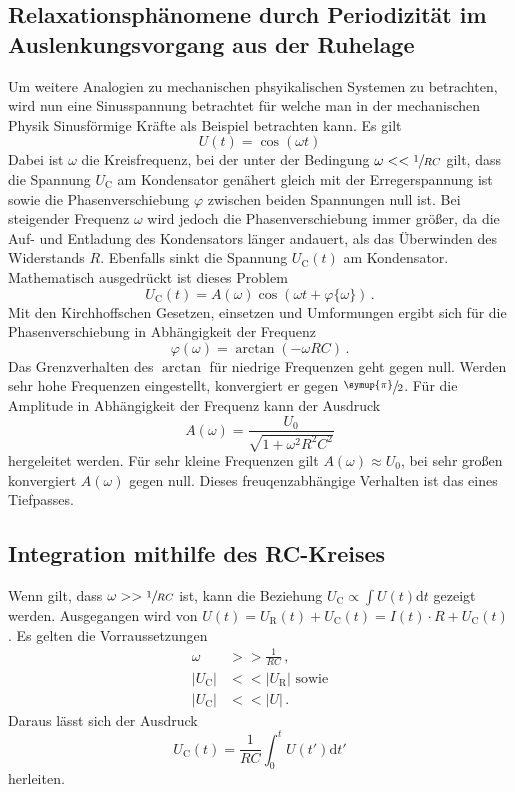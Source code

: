 \subsection{Relaxationsphänomene durch Periodizität im Auslenkungsvorgang
aus der Ruhelage}
Um weitere Analogien zu mechanischen phsyikalischen Systemen zu betrachten,
wird nun eine Sinusspannung betrachtet für welche man in der mechanischen 
Physik Sinusförmige Kräfte als Beispiel betrachten kann. Es gilt
\begin{equation}
    U(t)=\cos(\omega t)
\end{equation}
Dabei ist $\omega$ die Kreisfrequenz, bei der unter der Bedingung $\omega<<\sfrac{1}{RC}$
gilt, dass die Spannung $U_\text{C}$ am Kondensator genähert gleich mit der Erregerspannung ist
sowie die Phasenverschiebung $\varphi$ zwischen beiden Spannungen null ist.
Bei steigender Frequenz $\omega$ wird jedoch die Phasenverschiebung immer größer,
da die Auf- und Entladung des Kondensators länger andauert, als das Überwinden des
Widerstands $R$. Ebenfalls sinkt die Spannung $U_\text{C}(t)$ am Kondensator.
Mathematisch ausgedrückt ist dieses Problem 
\begin{equation*}
    U_\text{C}(t)=A(\omega)\cos(\omega t+\varphi\{\omega\})\,.
\end{equation*}
Mit den Kirchhoffschen Gesetzen, einsetzen und Umformungen ergibt sich für die Phasenverschiebung
in Abhängigkeit der Frequenz
\begin{equation}
    \varphi(\omega)=\arctan(-\omega RC)\,.
    \label{eq:arctan1}
\end{equation}
Das Grenzverhalten des $\arctan$ für niedrige Frequenzen geht gegen null.
Werden sehr hohe Frequenzen eingestellt, konvergiert er gegen $\sfrac{\symup{\pi}}{2}$.
Für die Amplitude in Abhängigkeit der Frequenz kann der Ausdruck
\begin{equation}
    A(\omega)=\frac{U_0}{\sqrt{1+\omega^2R^2C^2}}
    \label{eq:arctan}
\end{equation}
hergeleitet werden. Für sehr kleine Frequenzen gilt $A(\omega)\approx U_0$, bei sehr großen
konvergiert $A(\omega)$ gegen null. Dieses freuqenzabhängige Verhalten ist das eines
Tiefpasses.
\subsection{Integration mithilfe des RC-Kreises}
Wenn gilt, dass $\omega >>\sfrac{1}{RC}$ ist, kann die Beziehung
$U_\text{C}\propto\int U(t)\text{d}t$ gezeigt werden. Ausgegangen wird von
$U(t)=U_\text{R}(t)+U_\text{C}(t)=I(t)\cdot R+U_\text{C}(t)$.
Es gelten die Vorraussetzungen
\begin{align*}
    \omega &>>\frac{1}{RC}\,,\\
    |U_\text{C}|&<<|U_\text{R}|\text{ sowie}\\
    |U_\text{C}|&<<|U|\,.
\end{align*}
Daraus lässt sich der Ausdruck
\begin{equation}
    U_\text{C}(t)=\frac{1}{RC}\int_0^t U(t')\text{d}t'
    \label{eq:integrator}
\end{equation}
herleiten.